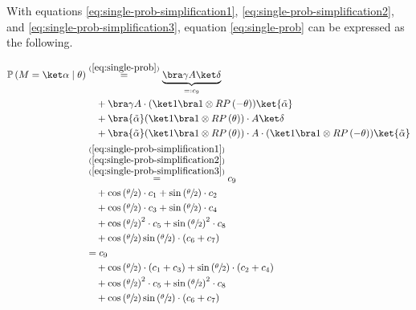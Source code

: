 With equations \ref{eq:single-prob-simplification1},
\ref{eq:single-prob-simplification2}, and \ref{eq:single-prob-simplification3},
equation \ref{eq:single-prob} can be expressed as the following.

\begin{equation}
    \label{eq:single-prob-simplified}
    \begin{split}
        \mathbb{P}\left(M = \ket\alpha \mid \theta\right)
            &\stackrel{(\ref{eq:single-prob})}= \underbrace{\bra\gamma A \ket\delta}_{=: c_9} \\
                &\quad + \bra\gamma A \cdot (\ket 1 \bra 1 \otimes RP\left(-\theta\right)) \ket{\tilde\alpha} \\
                &\quad + \bra{\tilde\alpha} (\ket 1 \bra 1 \otimes RP\left(\theta\right)) \cdot A \ket\delta \\
                &\quad + \bra{\tilde\alpha} (\ket 1 \bra 1 \otimes RP\left(\theta\right)) \cdot A \cdot (\ket 1 \bra 1 \otimes RP\left(-\theta\right)) \ket{\tilde\alpha} \\
            &\stackrel{\substack{(\ref{eq:single-prob-simplification1})\\(\ref{eq:single-prob-simplification2})\\(\ref{eq:single-prob-simplification3})}}=
                c_9 \\
                &\quad + \cos\left(\sfrac\theta2\right) \cdot c_1 + \sin\left(\sfrac\theta2\right) \cdot c_2 \\
                &\quad + \cos\left(\sfrac\theta2\right) \cdot c_3 + \sin\left(\sfrac\theta2\right) \cdot c_4 \\
                &\quad + \cos\left(\sfrac\theta2\right)^2 \cdot c_5 + \sin\left(\sfrac\theta2\right)^2 \cdot c_8 \\
                &\quad + \cos\left(\sfrac\theta2\right)\sin\left(\sfrac\theta2\right) \cdot \left(c_6 + c_7\right) \\
            &= c_9 \\
                &\quad + \cos\left(\sfrac\theta2\right) \cdot \left(c_1 + c_3\right) + \sin\left(\sfrac\theta2\right) \cdot \left(c_2 + c_4\right) \\
                &\quad + \cos\left(\sfrac\theta2\right)^2 \cdot c_5 + \sin\left(\sfrac\theta2\right)^2 \cdot c_8 \\
                &\quad + \cos\left(\sfrac\theta2\right)\sin\left(\sfrac\theta2\right) \cdot \left(c_6 + c_7\right) \\
    \end{split}
\end{equation}

